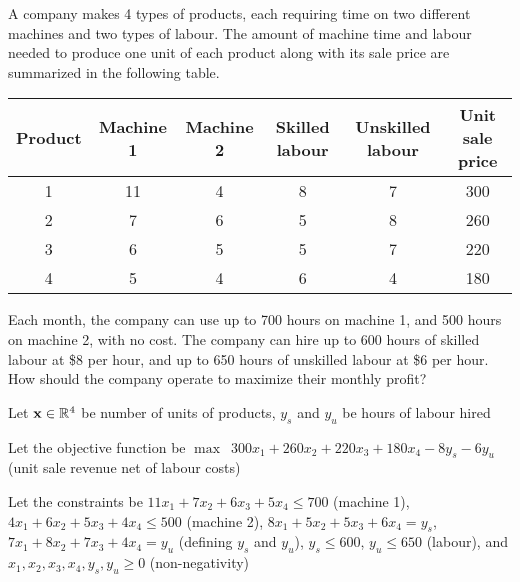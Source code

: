\documentclass[class=co250,tikz,notes]{agony}
\begin{document}
\begin{example}
  A company makes 4 types of products, each requiring time on two different machines and two types of labour. The amount of machine time and labour needed to produce one unit of each product along with its sale price are summarized in the following table.
  \begin{center}
    \begin{tabular}{c|ccccc}
      Product & Machine 1 & Machine 2 & Skilled labour & Unskilled labour & Unit sale price \\ \hline
      1       & 11        & 4         & 8              & 7                & 300             \\
      2       & 7         & 6         & 5              & 8                & 260             \\
      3       & 6         & 5         & 5              & 7                & 220             \\
      4       & 5         & 4         & 6              & 4                & 180             \\
    \end{tabular}
  \end{center}
  Each month, the company can use up to 700 hours on machine 1, and 500 hours on machine 2, with no cost. The company can hire up to 600 hours of skilled labour at \$8 per hour, and up to 650 hours of unskilled labour at \$6 per hour. How should the company operate to maximize their monthly profit?
\end{example}
\begin{sol}
  Let $\vb x \in \mathbb{R}^4$ be number of units of products, $y_s$ and $y_u$ be hours of labour hired

  Let the objective function be $\max \enspace 300 x_1 + 260 x_2 + 220 x_3 + 180 x_4 - 8y_s - 6y_u$ (unit sale revenue net of labour costs)

  Let the constraints be $11x_1 + 7x_2 + 6x_3 + 5x_4 \leq 700$ (machine 1), $4x_1 + 6x_2 + 5x_3 + 4x_4 \leq 500$ (machine 2), $8x_1 + 5x_2 + 5x_3 + 6x_4 = y_s$, $7x_1 + 8x_2 + 7x_3 + 4x_4 = y_u$ (defining $y_s$ and $y_u$), $y_s \leq 600$, $y_u \leq 650$ (labour), and $x_1, x_2, x_3, x_4, y_s, y_u \geq 0$ (non-negativity)
\end{sol}
\end{document}
